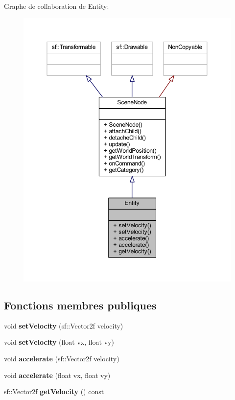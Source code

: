 Graphe de collaboration de Entity\+:\nopagebreak
\begin{figure}[H]
\begin{center}
\leavevmode
\includegraphics[width=350pt]{class_entity__coll__graph}
\end{center}
\end{figure}
\subsection*{Fonctions membres publiques}
\begin{DoxyCompactItemize}
\item 
void {\bfseries set\+Velocity} (sf\+::\+Vector2f velocity)\hypertarget{class_entity_a5bf79843c973eac1fdbebfd1fc83a1e8}{}\label{class_entity_a5bf79843c973eac1fdbebfd1fc83a1e8}

\item 
void {\bfseries set\+Velocity} (float vx, float vy)\hypertarget{class_entity_a7873fbd61cf1a742d4492ec438a9ac9f}{}\label{class_entity_a7873fbd61cf1a742d4492ec438a9ac9f}

\item 
void {\bfseries accelerate} (sf\+::\+Vector2f velocity)\hypertarget{class_entity_a80cdb89f11d47716781bc567efd2bcda}{}\label{class_entity_a80cdb89f11d47716781bc567efd2bcda}

\item 
void {\bfseries accelerate} (float vx, float vy)\hypertarget{class_entity_a2ff2403c455f15b3fe5d04e922b3943d}{}\label{class_entity_a2ff2403c455f15b3fe5d04e922b3943d}

\item 
sf\+::\+Vector2f {\bfseries get\+Velocity} () const \hypertarget{class_entity_ad428181660f03f4a800461e1810e5937}{}\label{class_entity_ad428181660f03f4a800461e1810e5937}

\end{DoxyCompactItemize}
